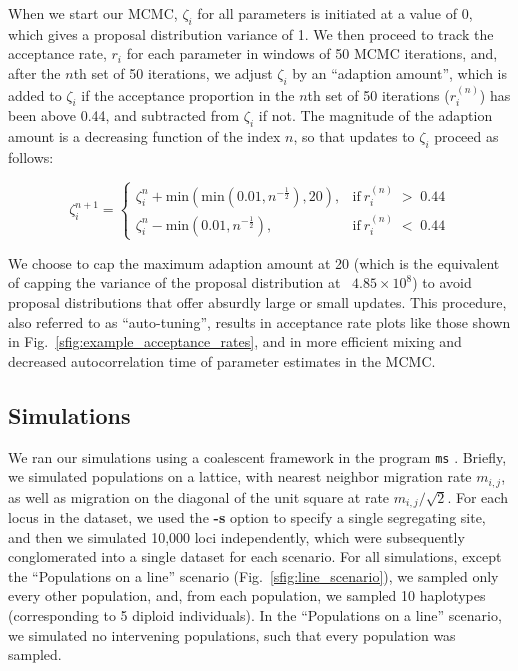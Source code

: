 \documentclass[10pt,letterpaper]{article}
\begin{document}
When we start our MCMC, $\zeta_i$ for all parameters is initiated at a value of 0, which gives a proposal distribution variance of 1.  We then proceed to track the acceptance rate, $r_i$ for each parameter in windows of 50 MCMC iterations, and, after the $n$th set of 50 iterations, we adjust $\zeta_i$ by an ``adaption amount'', which is added to $\zeta_i$ if the acceptance proportion in the $n$th set of 50 iterations ($r^{(n)}_i$) has been above 0.44, and subtracted from $\zeta_i$ if not.  The magnitude of the adaption amount is a decreasing function of the index $n$, so that updates to $\zeta_i$ proceed as follows:

\begin{equation}
\zeta^{n+1}_i =
\begin{cases}
\zeta^{n}_i + \text{min}(\text{min}(0.01,n^{-\frac{1}{2}}),20), & \text{if} \: r^{(n)}_i \; > \; 0.44 \\
\zeta^{n}_i - \text{min}(0.01,n^{-\frac{1}{2}}), & \text{if} \: r^{(n)}_i \; < \; 0.44
\end{cases}
\label{eq:adpative_mcmc}
\end{equation}

We choose to cap the maximum adaption amount at 20 (which is the equivalent of capping the variance of the proposal distribution at ~$4.85 \times 10^8$) to avoid proposal distributions that offer absurdly large or small updates.  This procedure, also referred to as ``auto-tuning'', results in acceptance rate plots like those shown in Fig.\ \ref{sfig:example_acceptance_rates}, and in more efficient mixing and decreased autocorrelation time of parameter estimates in the MCMC.

\subsection*{Simulations}
We ran our simulations using a coalescent framework in the program \texttt{ms} \cite{Hudson2002}.  Briefly, we simulated populations on a lattice, with nearest neighbor migration rate $m_{i,j}$, as well as migration on the diagonal of the unit square at rate $m_{i,j}/\sqrt{2}$.  For each locus in the dataset, we used the \textbf{-s} option to specify a single segregating site, and then we simulated 10,000 loci independently, which were subsequently conglomerated into a single dataset for each scenario.  For all simulations, except the ``Populations on a line'' scenario (Fig.\ \ref{sfig:line_scenario}), we sampled only every other population, and, from each population, we sampled 10 haplotypes (corresponding to 5 diploid individuals).  In the ``Populations on a line'' scenario, we simulated no intervening populations, such that every population was sampled.
\end{document}
